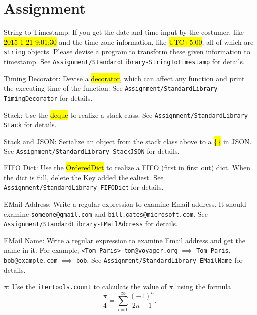 \documentclass[english]{../TeXTemplate/pkupaper}
\begin{document}
\section{Assignment}
\begin{thmque}[Required]
String to Timestamp: If you get the date and time input by the costumer, like \hl{2015-1-21 9:01:30} and the time zone information, like \hl{UTC+5:00}, all of which are \texttt{string} objects. Please devise a program to transform these given information to timestamp. See \verb"Assignment/StandardLibrary-StringToTimestamp" for details.
\end{thmque}
\begin{thmque}
Timing Decorator: Devise a \hl{decorator}, which can affect any function and print the executing time of the function. See \verb"Assignment/StandardLibrary-TimingDecorator" for details.
\end{thmque}
\begin{thmque}[Required]
Stack: Use the \hl{deque} to realize a stack class. See \verb"Assignment/StandardLibrary-Stack" for details.
\end{thmque}
\begin{thmque}
Stack and JSON: Serialize an object from the stack class above to a \hl{\{\}} in JSON. See \verb"Assignment/StandardLibrary-StackJSON" for details.
\end{thmque}
\begin{thmque}[Required]
FIFO Dict: Use the \hl{OrderedDict} to realize a FIFO (first in first out) dict. When the dict is full, delete the Key added the ealiest. See \verb"Assignment/StandardLibrary-FIFODict" for details.
\end{thmque}
\begin{thmque}[Required]
EMail Address: Write a regular expression to examine Email address. It should examine \verb"someone@gmail.com" and \verb"bill.gates@microsoft.com". See \verb"Assignment/StandardLibrary-EMailAddress" for details.
\end{thmque}
\begin{thmque}
EMail Name: Write a regular expression to examine Email address and get the name in it. For example, \verb"<Tom Paris> tom@voyager.org" $\implies$ \verb"Tom Paris", \verb"bob@example.com" $\implies$ \verb"bob". See \verb"Assignment/StandardLibrary-EMailName" for details.
\end{thmque}
\begin{thmque}
$\pi$: Use the \verb"itertools.count" to calculate the value of $\pi$, using the formula
\begin{equation}
\frac{\pi}{4} = \sum_{i=0}^{\infty}{ \frac{(-1)^n }{ 2 n + 1 } }.
\end{equation}
\end{thmque}
\end{document}
